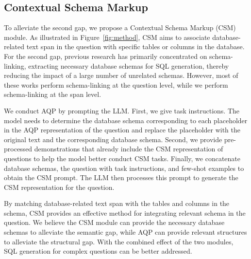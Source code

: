 
\subsection{Contextual Schema Markup}\label{method_CSM}

To alleviate the second gap, we propose a Contextual Schema Markup (CSM) module. As illustrated in Figure~\ref{fig:method}, CSM aims to associate database-related text span in the question with specific tables or columns in the database. 
For the second gap, previous research has primarily concentrated on schema-linking, extracting necessary database schemas for SQL generation, thereby reducing the impact of a large number of unrelated schemas.
However, most of these works perform schema-linking at the question level, while we perform schema-linking at the span level. 

We conduct AQP by prompting the LLM. 
First, we give task instructions. The model needs to determine the database schema corresponding to each placeholder in the AQP representation of the question and replace the placeholder with the original text and the corresponding database schema.
Second, we provide pre-processed demonstrations that already include the CSM representation of questions to help the model better conduct CSM tasks.
Finally, we concatenate database schemas, the question with task instructions, and few-shot examples to obtain the CSM prompt. The LLM then processes this prompt to generate the CSM representation for the question.

By matching database-related text span with the tables and columns in the schema, CSM provides an effective method for integrating relevant schema in the question. 
We believe the CSM module can provide the necessary database schemas to alleviate the semantic gap, while AQP can provide relevant structures to alleviate the structural gap. With the combined effect of the two modules, SQL generation for complex questions can be better addressed.


